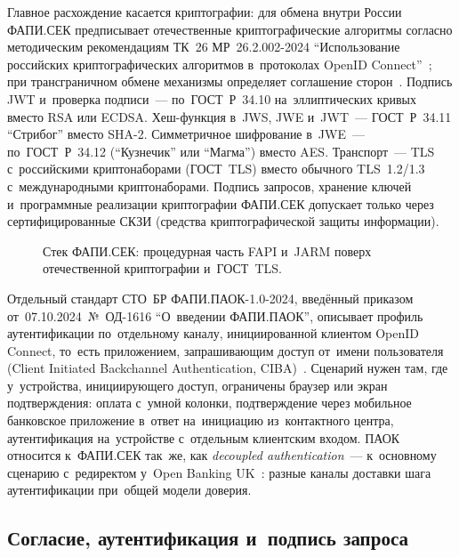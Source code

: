 Главное расхождение касается криптографии: для обмена внутри России ФАПИ.СЕК
предписывает отечественные криптографические алгоритмы согласно методическим
рекомендациям ТК~26 МР~26.2.002-2024 \enquote{Использование российских
  криптографических алгоритмов в~протоколах OpenID
Connect}~\cite{tc26-mr-26-2-002-2024}; при трансграничном обмене механизмы
определяет соглашение сторон~\cite{fapi-sec-2024}. Подпись JWT и~проверка подписи~---
по~ГОСТ~Р~34.10 на~эллиптических кривых вместо RSA или ECDSA. Хеш-функция
в~JWS, JWE и~JWT~--- ГОСТ~Р~34.11 \enquote{Стрибог} вместо SHA-2.
Симметричное шифрование в~JWE~--- по~ГОСТ~Р~34.12 (\enquote{Кузнечик} или
\enquote{Магма}) вместо AES. Транспорт~--- TLS с~российскими криптонаборами
(ГОСТ~TLS) вместо обычного TLS~1.2/1.3 с~международными криптонаборами. Подпись
запросов, хранение ключей и~программные реализации криптографии ФАПИ.СЕК
допускает только через сертифицированные СКЗИ (средства криптографической
защиты информации).

\begin{figure}[tbp]
  \centering
  \caption{Стек ФАПИ.СЕК: процедурная часть FAPI и~JARM поверх
  отечественной криптографии и~ГОСТ~TLS.}\label{fig:fapi-sec-stack}
\end{figure}

Отдельный стандарт СТО~БР ФАПИ.ПАОК-1.0-2024, введённый приказом
от~07.10.2024~№~ОД-1616 \enquote{О~введении ФАПИ.ПАОК}, описывает профиль
аутентификации по~отдельному каналу, инициированной клиентом OpenID Connect,
то~есть приложением, запрашивающим доступ от~имени пользователя (Client
Initiated Backchannel Authentication, CIBA)~\cite{fapi-paok-2024}. Сценарий нужен там, где у~устройства, инициирующего
доступ, ограничены браузер или экран подтверждения: оплата с~умной
колонки, подтверждение через мобильное банковское приложение в~ответ
на~инициацию из~контактного центра, аутентификация на~устройстве с~отдельным
клиентским входом. ПАОК относится к~ФАПИ.СЕК так~же, как
\textit{decoupled authentication}~--- к~основному сценарию с~редиректом у~Open
Banking UK~\cite{openbanking-uk-authentication-methods}: разные каналы доставки шага
аутентификации при~общей модели доверия.

\subsection*{Согласие, аутентификация и~подпись запроса}

